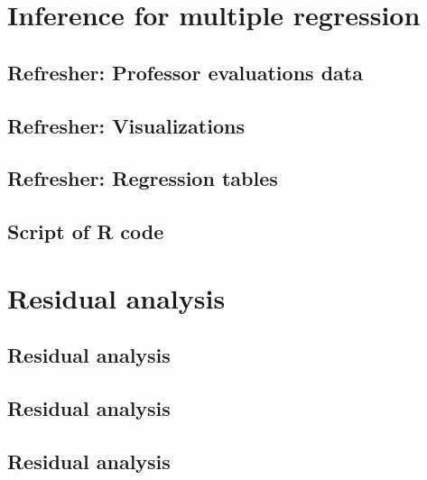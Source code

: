 \documentclass[12pt, krantz2,]{krantz}
\begin{document}
\hypertarget{inference-for-multiple-regression}{%
\section{Inference for multiple regression}\label{inference-for-multiple-regression}}

\hypertarget{refresher-professor-evaluations-data}{%
\subsection{Refresher: Professor evaluations data}\label{refresher-professor-evaluations-data}}

\hypertarget{refresher-visualizations}{%
\subsection{Refresher: Visualizations}\label{refresher-visualizations}}

\hypertarget{refresher-regression-tables}{%
\subsection{Refresher: Regression tables}\label{refresher-regression-tables}}

\hypertarget{script-of-r-code}{%
\subsection{Script of R code}\label{script-of-r-code}}

\hypertarget{residual-analysis}{%
\section{Residual analysis}\label{residual-analysis}}

\hypertarget{model1residuals}{%
\subsection{Residual analysis}\label{model1residuals}}

\hypertarget{model2residuals}{%
\subsection{Residual analysis}\label{model2residuals}}

\hypertarget{model3residuals}{%
\subsection{Residual analysis}\label{model3residuals}}
\end{document}

